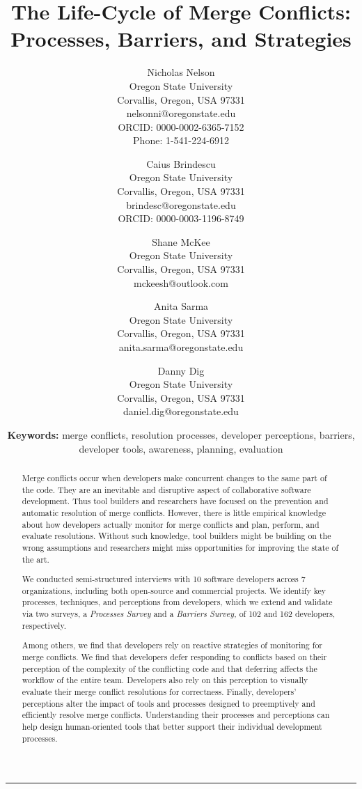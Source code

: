 \documentclass{article}
\title{
\vspace*{-4.2\baselineskip}
{\LARGE \bfseries {The Life-Cycle of Merge Conflicts: Processes, Barriers, and Strategies}}}
\author{\large
Nicholas Nelson\\Oregon State University\\Corvallis, Oregon, USA 97331\\nelsonni@oregonstate.edu\\ORCID: 0000-0002-6365-7152\\Phone: 1-541-224-6912
\and 
Caius Brindescu\\Oregon State University\\Corvallis, Oregon, USA 97331\\brindesc@oregonstate.edu\\ORCID: 0000-0003-1196-8749
\and
Shane McKee\\Oregon State University\\Corvallis, Oregon, USA 97331\\mckeesh@outlook.com
\and
Anita Sarma\\Oregon State University\\Corvallis, Oregon, USA 97331\\anita.sarma@oregonstate.edu
\and
Danny Dig\\Oregon State University\\Corvallis, Oregon, USA 97331\\daniel.dig@oregonstate.edu
}
\date{{\textbf{Keywords: } merge conflicts, resolution processes, developer perceptions, barriers, developer tools, awareness, planning, evaluation}}
\begin{document}
\maketitle

\hrule

\begin{abstract}
Merge conflicts occur when developers make concurrent changes to the same part of the code.
They are an inevitable and disruptive aspect of collaborative software development.
Thus tool builders and researchers have focused on the prevention and automatic resolution of merge conflicts.
However, there is little empirical knowledge about how developers actually monitor for merge conflicts and plan, perform, and evaluate resolutions.
Without such knowledge, tool builders might be building on the wrong assumptions and researchers might miss opportunities for improving the state of the art.

We conducted semi-structured interviews with 10 software developers across 7 organizations, including both open-source and commercial projects.
We identify key processes, techniques, and perceptions from developers, which we extend and validate via two surveys, a \emph{Processes Survey} and a \emph{Barriers Survey,} of 102 and 162 developers, respectively.

Among others, we find that developers rely on reactive strategies of monitoring for merge conflicts.
We find that developers defer responding to conflicts based on their perception of the complexity of the conflicting code and that deferring affects the workflow of the entire team.
Developers also rely on this perception to visually evaluate their merge conflict resolutions for correctness.
Finally, developers' perceptions alter the impact of tools and processes designed to preemptively and efficiently resolve merge conflicts.
Understanding their processes and perceptions can help design human-oriented tools that better support their individual development processes.
\end{abstract}
\vfill
\newpage
\end{document}
